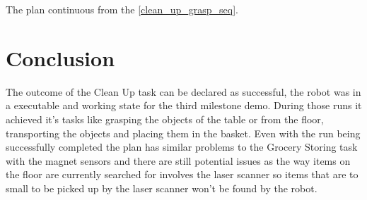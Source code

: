 \documentclass[main.tex]{subfiles}
\begin{document}
    The plan continuous from the \ref{clean_up_grasp_seq}.
    
    
	\section{Conclusion}
	The outcome of the Clean Up task can be declared as successful, the robot was in a executable and working state for the third milestone demo. During those runs it achieved it's tasks like grasping the objects of the table or from the floor, transporting the objects and placing them in the basket.
	Even with the run being successfully completed the plan has similar problems to the Grocery Storing task with the magnet sensors and there are still potential issues as the way items on the floor are currently searched for involves the laser scanner so items that are to small to be picked up by the laser scanner won't be found by the robot.
	\endgroup
\end{document}
